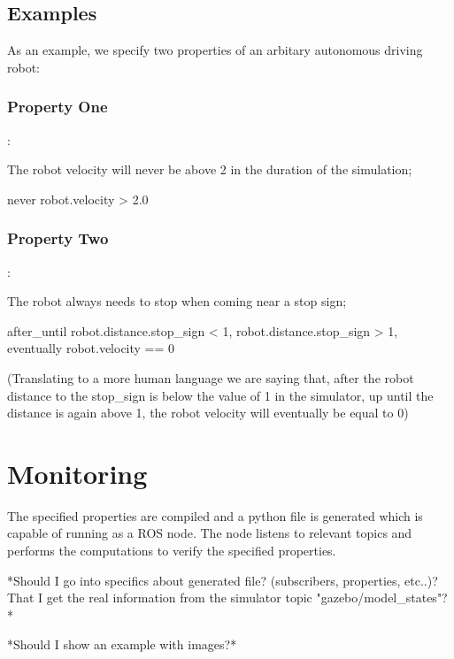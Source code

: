 \documentclass[runningheads]{llncs}
\begin{document}
\subsection{Examples}

As an example, we specify two properties of an arbitary autonomous driving robot:

\subsubsection{Property One}:

The robot velocity will never be above 2 in the duration of the simulation;

never robot.velocity > 2.0

\subsubsection{Property Two}:

The robot always needs to stop when coming near a stop sign;

after\_until robot.distance.stop\_sign < 1, robot.distance.stop\_sign > 1, eventually robot.velocity == 0

(Translating to a more human language we are saying that, after the robot distance to the stop\_sign is below the value of 1 in the simulator, up until the distance is again above 1, the robot velocity will eventually be equal to 0)

\section{Monitoring}

The specified properties are compiled and a python file is generated which is capable of running as a ROS node. The node listens to relevant topics and performs the computations to verify the specified properties.

*Should I go into specifics about generated file? (subscribers, properties, etc..)? That I get the real information from the simulator topic "gazebo/model\_states"?*

*Should I show an example with images?*


\end{document}
